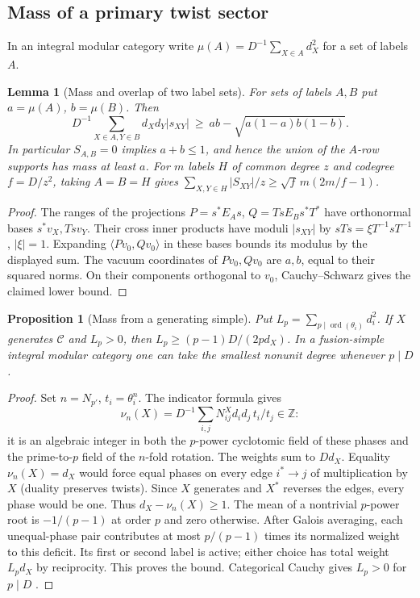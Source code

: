 \documentclass[11pt,a4paper]{article}
\numberwithin{equation}{section}
\newtheorem{proposition}[theorem]{Proposition}
\newtheorem{lemma}[theorem]{Lemma}
\theoremstyle{remark}
\newcommand{\C}{\mathcal C}
\newcommand{\ZZ}{\mathbb Z}
\DeclareMathOperator{\ord}{ord}
\begin{document}
\subsection{Mass of a primary twist sector}\label{fam:M:sec:3.3}\label{sec:twist-mass}
In an integral modular category write $\mu(A)=D^{-1}\sum_{X\in A}d_X^2$ for a set of labels $A$.
\begin{lemma}[Mass and overlap of two label sets]\label{fam:M:3.6}\label{mass}
For sets of labels $A,B$ put $a=\mu(A)$, $b=\mu(B)$. Then
\[
 D^{-1}\sum_{X\in A,Y\in B} d_Xd_Y|s_{XY}|
 \ \ge\ ab-\sqrt{a(1-a)b(1-b)}.
\]
In particular $S_{A,B}=0$ implies $a+b\le1$, and hence the
union of the $A$-row supports has mass at least $a$. For $m$ labels
$H$ of common degree $z$ and codegree $f=D/z^2$, taking $A=B=H$
gives $\sum_{X,Y\in H}|S_{XY}|/z\ge\sqrt f\,m(2m/f-1)$.
\end{lemma}
\begin{proof}
The ranges of the projections $P=s^*E_As$, $Q=TsE_Bs^*T^*$ have
orthonormal bases $s^*v_X,Tsv_Y$. Their cross inner products have
moduli $|s_{XY}|$ by $sTs=\xi T^{-1}sT^{-1}$, $|\xi|=1$.
Expanding $\langle Pv_0,Qv_0\rangle$ in these bases bounds its
modulus by the displayed sum. The vacuum coordinates of $Pv_0,Qv_0$
are $a,b$, equal to their squared norms. On their components
orthogonal to $v_0$, Cauchy--Schwarz gives the claimed lower bound.
\end{proof}

\begin{proposition}[Mass from a generating simple]\label{fam:M:3.7}\label{th:fs}
Put $L_p=\sum_{p\mid\ord(\theta_i)}d_i^2$. If $X$ generates $\C$ and $L_p>0$, then $L_p\ge(p-1)D/(2p d_X)$. In a fusion-simple integral modular category one can take the smallest nonunit degree whenever $p\mid D$.
\end{proposition}
\begin{proof}
Set $n=N_{p'}$, $t_i=\theta_i^n$. The indicator formula \cite[Theorem~7.5]{NSfs} gives
\[
 \nu_n(X)=D^{-1}\sum_{i,j}N_{ij}^{X}d_i d_j\,t_i/t_j\in\ZZ :
\]
it is an algebraic integer in both the $p$-power cyclotomic field of these phases and the prime-to-$p$ field of the $n$-fold rotation. The weights sum to $Dd_X$. Equality $\nu_n(X)=d_X$ would force equal phases on every edge $i^*\to j$ of multiplication by $X$ (duality preserves twists). Since $X$ generates and $X^*$ reverses the edges, every phase would be one. Thus $d_X-\nu_n(X)\ge1$.
The mean of a nontrivial $p$-power root is $-1/(p-1)$ at order $p$ and zero otherwise. After Galois averaging, each unequal-phase pair contributes at most $p/(p-1)$ times its normalized weight to this deficit. Its first or second label is active; either choice has total weight $L_pd_X$ by reciprocity. This proves the bound. Categorical Cauchy gives $L_p>0$ for $p\mid D$ \cite[Theorem~3.9]{BNRWFinite}.
\end{proof}
\end{document}
